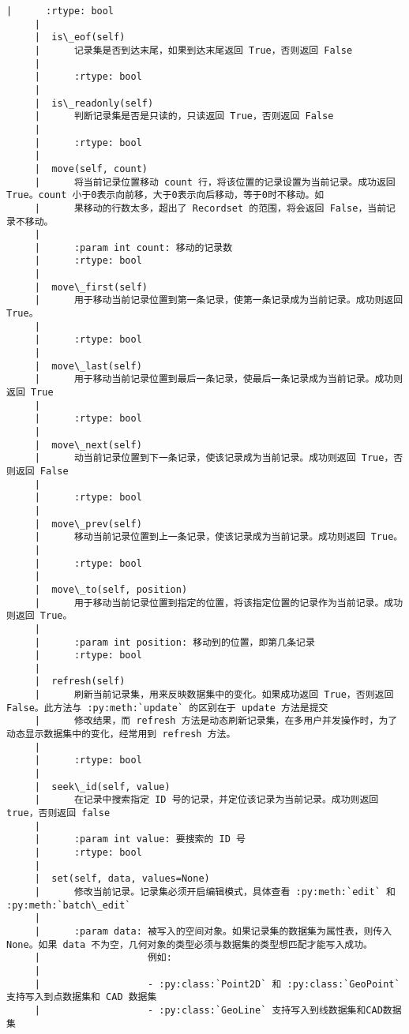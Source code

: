 \documentclass[11pt]{article}
\begin{document}
\begin{Verbatim}[commandchars=\\\{\}]
     |      :rtype: bool
     |  
     |  is\_eof(self)
     |      记录集是否到达末尾，如果到达末尾返回 True，否则返回 False
     |      
     |      :rtype: bool
     |  
     |  is\_readonly(self)
     |      判断记录集是否是只读的，只读返回 True，否则返回 False
     |      
     |      :rtype: bool
     |  
     |  move(self, count)
     |      将当前记录位置移动 count 行，将该位置的记录设置为当前记录。成功返回 True。count 小于0表示向前移，大于0表示向后移动，等于0时不移动。如
     |      果移动的行数太多，超出了 Recordset 的范围，将会返回 False，当前记录不移动。
     |      
     |      :param int count: 移动的记录数
     |      :rtype: bool
     |  
     |  move\_first(self)
     |      用于移动当前记录位置到第一条记录，使第一条记录成为当前记录。成功则返回 True。
     |      
     |      :rtype: bool
     |  
     |  move\_last(self)
     |      用于移动当前记录位置到最后一条记录，使最后一条记录成为当前记录。成功则返回 True
     |      
     |      :rtype: bool
     |  
     |  move\_next(self)
     |      动当前记录位置到下一条记录，使该记录成为当前记录。成功则返回 True，否则返回 False
     |      
     |      :rtype: bool
     |  
     |  move\_prev(self)
     |      移动当前记录位置到上一条记录，使该记录成为当前记录。成功则返回 True。
     |      
     |      :rtype: bool
     |  
     |  move\_to(self, position)
     |      用于移动当前记录位置到指定的位置，将该指定位置的记录作为当前记录。成功则返回 True。
     |      
     |      :param int position: 移动到的位置，即第几条记录
     |      :rtype: bool
     |  
     |  refresh(self)
     |      刷新当前记录集，用来反映数据集中的变化。如果成功返回 True，否则返回 False。此方法与 :py:meth:`update` 的区别在于 update 方法是提交
     |      修改结果，而 refresh 方法是动态刷新记录集，在多用户并发操作时，为了动态显示数据集中的变化，经常用到 refresh 方法。
     |      
     |      :rtype: bool
     |  
     |  seek\_id(self, value)
     |      在记录中搜索指定 ID 号的记录，并定位该记录为当前记录。成功则返回 true，否则返回 false
     |      
     |      :param int value: 要搜索的 ID 号
     |      :rtype: bool
     |  
     |  set(self, data, values=None)
     |      修改当前记录。记录集必须开启编辑模式，具体查看 :py:meth:`edit` 和 :py:meth:`batch\_edit`
     |      
     |      :param data: 被写入的空间对象。如果记录集的数据集为属性表，则传入 None。如果 data 不为空，几何对象的类型必须与数据集的类型想匹配才能写入成功。
     |                   例如:
     |      
     |                   - :py:class:`Point2D` 和 :py:class:`GeoPoint` 支持写入到点数据集和 CAD 数据集
     |                   - :py:class:`GeoLine` 支持写入到线数据集和CAD数据集

\end{Verbatim}
\end{document}
